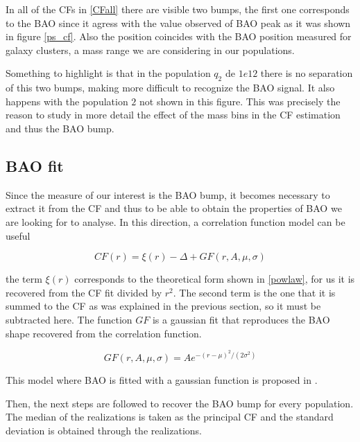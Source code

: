 In all of the CFs in \ref{CFall} there are visible two bumps, the first one
corresponds to the BAO since it agress with the value observed of BAO
peak as it was shown in figure \ref{ps_cf}.
Also the position coincides with the BAO position measured for galaxy clusters, 
a mass range we are considering in our populations. 

Something to highlight is that in the population $q_2$ de $1e12$ 
there is no separation of this two bumps, making more difficult to recognize the BAO signal. 
It also happens with the population $2$ not shown in this figure. This 
was precisely the reason to study in more detail the effect of the mass bins in the CF estimation 
and thus the BAO bump. 


\subsection{BAO fit}

Since the measure of our interest is the BAO bump, it becomes necessary
to extract it from the CF and thus to be able to obtain the properties of 
BAO we are looking for to analyse. In this direction, a correlation function 
model can be useful  

\begin{equation}
CF(r) = \xi(r) - \Delta + GF(r,A,\mu,\sigma)
\end{equation}

the term $\xi(r)$ corresponds to the theoretical form shown in \ref{powlaw},
for us it is recovered from the CF fit divided by $r^2$. 
The second term is the one that it is summed to the CF as was explained
in the previous section, so it must be subtracted here. 
The function $GF$ is a gaussian fit that reproduces the BAO shape recovered 
from the correlation function. 

\[GF(r,A,\mu,\sigma) = Ae^{-(r-\mu)^2/(2\sigma^2)}\]

This model where BAO is fitted with a gaussian function is proposed in \cite{BAO_model}. 

Then, the next steps are followed to recover the BAO bump for every population. 
The median of the realizations is taken as the principal CF and the standard
deviation is obtained through the realizations.

